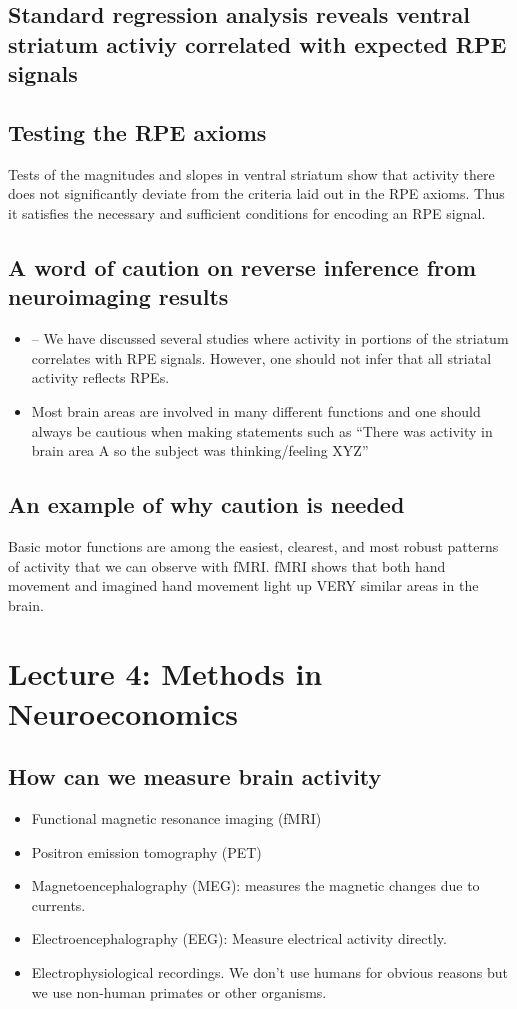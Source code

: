 \subsection{Standard regression analysis reveals ventral striatum activiy correlated with expected RPE signals}

\subsection{Testing the RPE axioms}
Tests of the magnitudes and slopes in ventral striatum show that activity there does not significantly deviate from the criteria laid out in the RPE axioms. Thus it satisfies the necessary and sufficient conditions for encoding an RPE signal.

\subsection{A word of caution on reverse inference from neuroimaging results
}
\begin{itemize}
    \item – We have discussed several studies where activity in portions of the striatum correlates with RPE signals. However, one should not infer that all striatal activity reflects RPEs.
    \item Most brain areas are involved in many different functions and one should always be cautious when making statements such as “There was activity in brain area A so the subject was thinking/feeling XYZ”
\end{itemize}

\subsection{An example of why caution is needed}
Basic motor functions are among the easiest, clearest, and most robust patterns of
activity that we can observe with fMRI. fMRI shows that both hand movement and imagined hand movement light up VERY similar areas in the brain.

\section{Lecture 4: Methods in Neuroeconomics}
\subsection{How can we measure brain activity}
\begin{itemize}
    \item Functional magnetic resonance imaging (fMRI)
    \item Positron emission tomography (PET)
    \item Magnetoencephalography (MEG): measures the magnetic changes due to currents.
    \item Electroencephalography (EEG): Measure electrical activity directly.
    \item Electrophysiological recordings. We don't use humans for obvious reasons but we use non-human primates or other organisms.
\end{itemize}

